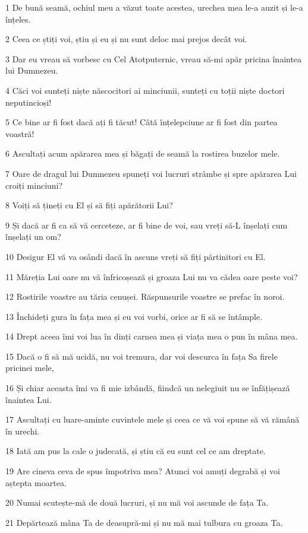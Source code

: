 \par 1 De bună seamă, ochiul meu a văzut toate acestea, urechea mea le-a auzit și le-a înțeles.
\par 2 Ceea ce știți voi, știu și eu și nu sunt deloc mai prejos decât voi.
\par 3 Dar eu vreau să vorbesc cu Cel Atotputernic, vreau să-mi apăr pricina înaintea lui Dumnezeu.
\par 4 Căci voi sunteți niște născocitori ai minciunii, sunteți cu toții niște doctori neputincioși!
\par 5 Ce bine ar fi fost dacă ați fi tăcut! Câtă înțelepciune ar fi fost din partea voastră!
\par 6 Ascultați acum apărarea mea și băgați de seamă la rostirea buzelor mele.
\par 7 Oare de dragul lui Dumnezeu spuneți voi lucruri strâmbe și spre apărarea Lui croiți minciuni?
\par 8 Voiți să țineți cu El și să fiți apărătorii Lui?
\par 9 Și dacă ar fi ca să vă cerceteze, ar fi bine de voi, sau vreți să-L înșelați cum înșelați un om?
\par 10 Desigur El vă va osândi dacă în ascuns vreți să fiți părtinitori cu El.
\par 11 Măreția Lui oare nu vă înfricoșează și groaza Lui nu va cădea oare peste voi?
\par 12 Rostirile voastre au tăria cenușei. Răspunsurile voastre se prefac în noroi.
\par 13 Închideți gura în fața mea și eu voi vorbi, orice ar fi să se întâmple.
\par 14 Drept aceea îmi voi lua în dinți carnea mea și viața mea o pun în mâna mea.
\par 15 Dacă o fi să mă ucidă, nu voi tremura, dar voi descurca în fața Sa firele pricinei mele,
\par 16 Și chiar aceasta îmi va fi mie izbândă, fiindcă un nelegiuit nu se înfățișează înaintea Lui.
\par 17 Ascultați cu luare-aminte cuvintele mele și ceea ce vă voi spune să vă rămână în urechi.
\par 18 Iată am pus la cale o judecată, și știu că eu sunt cel ce am dreptate.
\par 19 Are cineva ceva de spus împotriva mea? Atunci voi amuți degrabă și voi aștepta moartea.
\par 20 Numai scutește-mă de două lucruri, și nu mă voi ascunde de fața Ta.
\par 21 Depărtează mâna Ta de deasupră-mi și nu mă mai tulbura cu groaza Ta.
